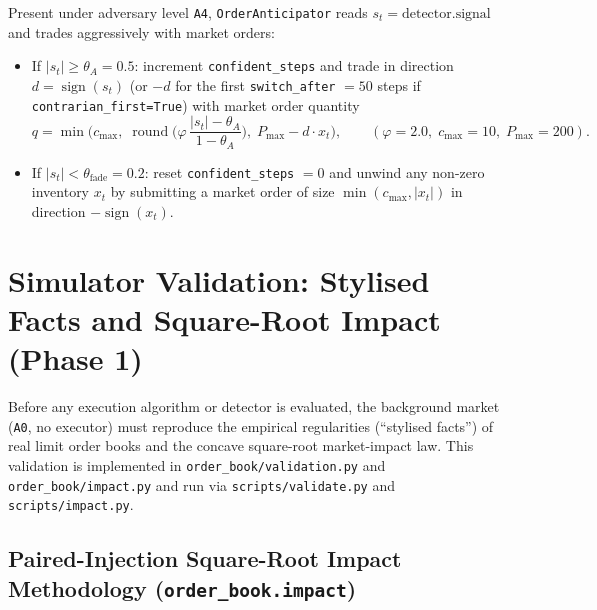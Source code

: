 \documentclass[11pt,a4paper]{article}
\newcommand{\code}[1]{\texttt{#1}}
\newcommand{\sign}{\operatorname{sign}}
\begin{document}
Present under adversary level \code{A4}, \code{OrderAnticipator} reads $s_t = \text{detector.signal}$ and
trades aggressively with market orders:
\begin{itemize}[nosep]
\item If $|s_t| \ge \theta_A = 0.5$: increment \code{confident\_steps} and trade in direction
  $d = \sign(s_t)$ (or $-d$ for the first \code{switch\_after} $= 50$ steps if
  \code{contrarian\_first=True}) with market order quantity
  \begin{equation}
    q = \min\!\Big(c_{\max},\; \operatorname{round}\!\Big(\varphi\,\frac{|s_t| - \theta_A}{1 - \theta_A}\Big),\;
    P_{\max} - d\cdot x_t\Big), \qquad (\varphi = 2.0,\; c_{\max} = 10,\; P_{\max} = 200).
  \end{equation}
\item If $|s_t| < \theta_{\text{fade}} = 0.2$: reset \code{confident\_steps} $= 0$ and unwind any non-zero
  inventory $x_t$ by submitting a market order of size $\min(c_{\max}, |x_t|)$ in direction $-\sign(x_t)$.
\end{itemize}

\section{Simulator Validation: Stylised Facts and Square-Root Impact (Phase 1)}
\label{sec:validation}

Before any execution algorithm or detector is evaluated, the background market (\code{A0}, no executor)
must reproduce the empirical regularities (``stylised facts'') of real limit order books and the concave
square-root market-impact law. This validation is implemented in \code{order\_book/validation.py} and
\code{order\_book/impact.py} and run via \code{scripts/validate.py} and \code{scripts/impact.py}.

\subsection{Paired-Injection Square-Root Impact Methodology (\code{order\_book.impact})}
\label{sec:impact}
\end{document}

